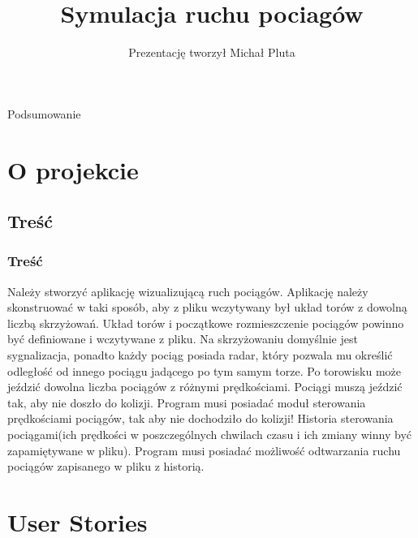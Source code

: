 \documentclass[a4paper, 11pt]{beamer}
\begin{document}
%
\title{Symulacja ruchu pociagów}
\author{Prezentację tworzył Michał Pluta}
%
\begin{frame} %
\titlepage %
\begin{center}
Podsumowanie
\end{center}
\end{frame}

\begin{frame}
\tableofcontents
\end{frame}

\section{O projekcie}
\subsection{Treść}
\begin{frame}
\frametitle{Treść}
Należy stworzyć aplikację wizualizującą ruch pociągów. Aplikację należy skonstruować w taki sposób, aby z pliku wczytywany był układ torów z dowolną liczbą skrzyżowań. Układ torów i początkowe rozmieszczenie pociągów powinno być definiowane i wczytywane z pliku. Na skrzyżowaniu domyślnie jest sygnalizacja, ponadto każdy pociąg posiada radar, który pozwala mu określić odległość od innego pociągu jadącego po tym samym torze. Po torowisku może jeździć dowolna liczba pociągów z różnymi prędkościami. Pociągi muszą jeździć tak, aby nie doszło do kolizji. Program musi posiadać moduł sterowania prędkościami pociągów, tak aby nie dochodziło do kolizji! Historia sterowania pociągami(ich prędkości w poszczególnych chwilach czasu i ich zmiany winny być zapamiętywane w pliku). Program musi posiadać możliwość odtwarzania ruchu pociągów zapisanego w pliku z historią.
\end{frame}
\section{User Stories}
\end{document}
